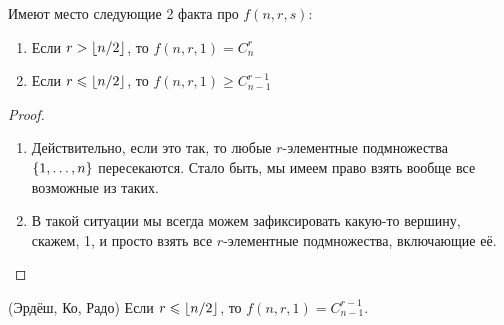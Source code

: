 \begin{proposition}
	Имеют место следующие 2 факта про $f(n, r, s)$:
	\begin{enumerate}
		\item Если $r > \left\lfloor n / 2 \right\rfloor$, то $f(n, r, 1) = C_n^r$
		
		\item Если $r \leqslant \left\lfloor n / 2 \right\rfloor$, то $f(n, r, 1) \ge C_{n - 1}^{r - 1}$
	\end{enumerate}
\end{proposition}

\begin{proof}~
	\begin{enumerate}
		\item Действительно, если это так, то любые $r$-элементные подмножества $\{1, \ldots, n\}$ пересекаются. Стало быть, мы имеем право взять вообще все возможные из таких.
		
		\item В такой ситуации мы всегда можем зафиксировать какую-то вершину, скажем, 1, и просто взять все $r$-элементные подмножества, включающие её.
	\end{enumerate}
\end{proof}

\begin{theorem} (Эрдёш, Ко, Радо)
	Если $r \leqslant \left\lfloor n / 2 \right\rfloor$, то $f(n, r, 1) = C_{n - 1}^{r - 1}$.
\end{theorem}

